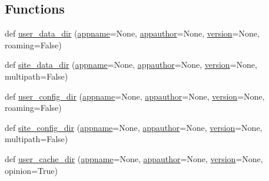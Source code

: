 \subsection*{Functions}
\begin{DoxyCompactItemize}
\item 
def \hyperlink{namespacepkg__resources_1_1__vendor_1_1appdirs_a3b03c46f6524b886b726517c7f76dad4}{user\+\_\+data\+\_\+dir} (\hyperlink{namespacepkg__resources_1_1__vendor_1_1appdirs_aa4e000c630ad65c9a27c71e3e40c198b}{appname}=None, \hyperlink{namespacepkg__resources_1_1__vendor_1_1appdirs_a0ecb77f81c567a26dd29b372a769505b}{appauthor}=None, \hyperlink{namespacepkg__resources_1_1__vendor_1_1appdirs_a7a6f6153b945504d785385b95c34369f}{version}=None, roaming=False)
\item 
def \hyperlink{namespacepkg__resources_1_1__vendor_1_1appdirs_acb43152414eb8ae400a05e490b103f31}{site\+\_\+data\+\_\+dir} (\hyperlink{namespacepkg__resources_1_1__vendor_1_1appdirs_aa4e000c630ad65c9a27c71e3e40c198b}{appname}=None, \hyperlink{namespacepkg__resources_1_1__vendor_1_1appdirs_a0ecb77f81c567a26dd29b372a769505b}{appauthor}=None, \hyperlink{namespacepkg__resources_1_1__vendor_1_1appdirs_a7a6f6153b945504d785385b95c34369f}{version}=None, multipath=False)
\item 
def \hyperlink{namespacepkg__resources_1_1__vendor_1_1appdirs_a30f0cf6e4ca4ce5a3b7d3c58e5049f05}{user\+\_\+config\+\_\+dir} (\hyperlink{namespacepkg__resources_1_1__vendor_1_1appdirs_aa4e000c630ad65c9a27c71e3e40c198b}{appname}=None, \hyperlink{namespacepkg__resources_1_1__vendor_1_1appdirs_a0ecb77f81c567a26dd29b372a769505b}{appauthor}=None, \hyperlink{namespacepkg__resources_1_1__vendor_1_1appdirs_a7a6f6153b945504d785385b95c34369f}{version}=None, roaming=False)
\item 
def \hyperlink{namespacepkg__resources_1_1__vendor_1_1appdirs_a99cc70bd4895bf161b501b38f35bde38}{site\+\_\+config\+\_\+dir} (\hyperlink{namespacepkg__resources_1_1__vendor_1_1appdirs_aa4e000c630ad65c9a27c71e3e40c198b}{appname}=None, \hyperlink{namespacepkg__resources_1_1__vendor_1_1appdirs_a0ecb77f81c567a26dd29b372a769505b}{appauthor}=None, \hyperlink{namespacepkg__resources_1_1__vendor_1_1appdirs_a7a6f6153b945504d785385b95c34369f}{version}=None, multipath=False)
\item 
def \hyperlink{namespacepkg__resources_1_1__vendor_1_1appdirs_a4b66dc639f1ae3dbbd1598ad39196a18}{user\+\_\+cache\+\_\+dir} (\hyperlink{namespacepkg__resources_1_1__vendor_1_1appdirs_aa4e000c630ad65c9a27c71e3e40c198b}{appname}=None, \hyperlink{namespacepkg__resources_1_1__vendor_1_1appdirs_a0ecb77f81c567a26dd29b372a769505b}{appauthor}=None, \hyperlink{namespacepkg__resources_1_1__vendor_1_1appdirs_a7a6f6153b945504d785385b95c34369f}{version}=None, opinion=True)

\end{DoxyCompactItemize}
